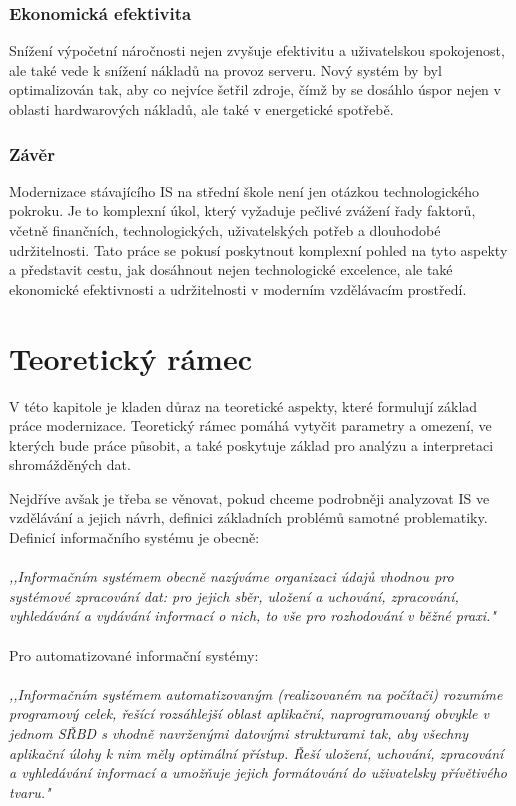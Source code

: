 \documentclass[FM,Proj]{tulthesis}
\begin{document}
\subsection*{Ekonomická efektivita}
Snížení výpočetní náročnosti nejen zvyšuje efektivitu a uživatelskou spokojenost, ale 
také vede k snížení nákladů na provoz serveru. Nový systém by byl optimalizován tak, 
aby co nejvíce šetřil zdroje, čímž by se dosáhlo úspor nejen v oblasti hardwarových nákladů,
ale také v energetické spotřebě.

\subsection*{Závěr}
Modernizace stávajícího IS na střední škole není jen otázkou technologického pokroku.
Je to komplexní úkol, který vyžaduje pečlivé zvážení řady faktorů, včetně finančních, 
technologických, uživatelských potřeb a dlouhodobé udržitelnosti. Tato práce se pokusí 
poskytnout komplexní pohled na tyto aspekty a představit cestu, jak dosáhnout nejen 
technologické excelence, ale také ekonomické efektivnosti a udržitelnosti v moderním 
vzdělávacím prostředí.

\chapter{Teoretický rámec}
V této kapitole je kladen důraz na teoretické aspekty, které formulují základ práce 
modernizace. Teoretický rámec pomáhá vytyčit parametry a omezení, ve kterých bude 
práce působit, a také poskytuje základ pro analýzu a interpretaci shromážděných dat. 

Nejdříve avšak je třeba se věnovat, pokud chceme podrobněji analyzovat IS ve vzdělávání 
a jejich návrh, definici základních problémů samotné problematiky. Definicí 
informačního systému je obecně:
\\\\
\textit{,,Informačním systémem obecně nazýváme organizaci údajů vhodnou pro systémové 
zpracování dat: pro jejich sběr, uložení a uchování, zpracování, vyhledávání a vydávání 
informací o nich, to vše pro rozhodování v běžné praxi."}\cite{Sarmanova2008ISaDS}
\\\\
Pro automatizované informační systémy:
\\\\
\textit{,,Informačním systémem automatizovaným (realizovaném na počítači) rozumíme programový 
celek, řešící rozsáhlejší oblast aplikační, naprogramovaný obvykle v jednom SŘBD s 
vhodně navrženými datovými strukturami tak, aby všechny aplikační úlohy k nim měly optimální 
přístup. Řeší uložení, uchování, zpracování a vyhledávání informací a umožňuje jejich 
formátování do uživatelsky přívětivého tvaru."}\cite{Sarmanova2008ISaDS}
\end{document}

